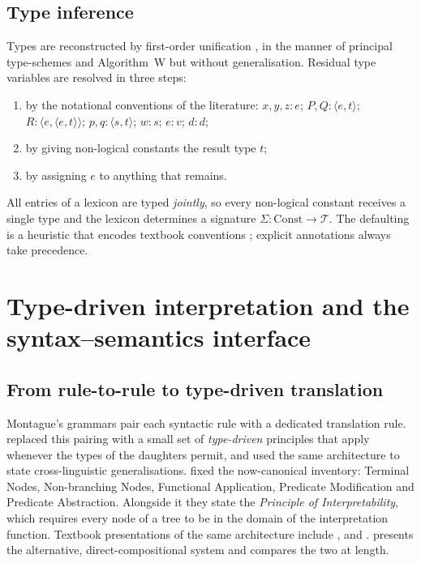 \documentclass[11pt,a4paper]{article}
\newcommand{\ty}[1]{\langle #1\rangle}
\theoremstyle{definition}
\begin{document}
\subsection{Type inference}
Types are reconstructed by first-order unification \citep{robinson1965}, in the manner of principal type-schemes \citep{hindley1969} and Algorithm~W \citep{milner1978} but without generalisation. Residual type variables are resolved in three steps:
\begin{enumerate}[1.]
\item by the notational conventions of the literature: $x,y,z{:}e$; $P,Q{:}\ty{e,t}$; $R{:}\ty{e,\ty{e,t}}$; $p,q{:}\ty{s,t}$; $w{:}s$; $e{:}v$; $d{:}d$;
\item by giving non-logical constants the result type $t$;
\item by assigning $e$ to anything that remains.
\end{enumerate}
All entries of a lexicon are typed \emph{jointly}, so every non-logical constant receives a single type and the lexicon determines a signature $\Sigma:\mathrm{Const}\to\mathcal{T}$. The defaulting is a heuristic that encodes textbook conventions \citep{heimkratzer1998,coppockchampollion2024}; explicit annotations always take precedence.

\section{Type-driven interpretation and the syntax--semantics interface}\label{sec:typedriven}

\subsection{From rule-to-rule to type-driven translation}
Montague's grammars pair each syntactic rule with a dedicated translation rule. \citet{kleinsag1985} replaced this pairing with a small set of \emph{type-driven} principles that apply whenever the types of the daughters permit, and \citet{bittner1994} used the same architecture to state cross-linguistic generalisations. \citet{heimkratzer1998} fixed the now-canonical inventory: Terminal Nodes, Non-branching Nodes, Functional Application, Predicate Modification and Predicate Abstraction. Alongside it they state the \emph{Principle of Interpretability}, which requires every node of a tree to be in the domain of the interpretation function. Textbook presentations of the same architecture include \citet{chierchiamcg2000}, \citet{winter2016} and \citet{coppockchampollion2024}. \citet{jacobson2014} presents the alternative, direct-compositional system and compares the two at length.
\end{document}
